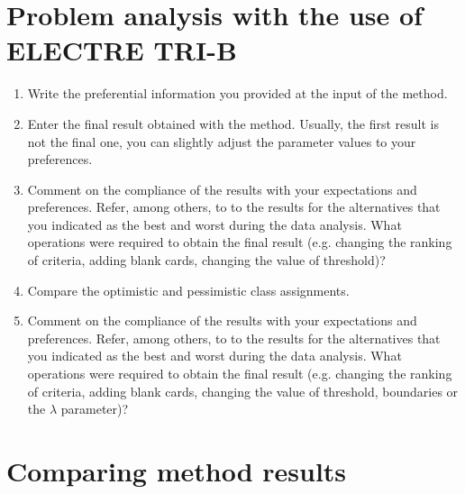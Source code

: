 \documentclass{article}
\begin{document}

\section{Problem analysis with the use of ELECTRE TRI-B}

\begin{enumerate}

    \item Write the preferential information you provided at the input of the method.

    \item Enter the final result obtained with the method. Usually, the first result is not the final one, you can
    slightly adjust the parameter values to your preferences.

    \item Comment on the compliance of the results with your expectations and preferences. Refer, among
    others, to to the results for the alternatives that you indicated as the best and worst during the data
    analysis. What operations were required to obtain the final result (e.g. changing the ranking of criteria,
    adding blank cards, changing the value of threshold)?

    \item Compare the optimistic and pessimistic class assignments.

    \item Comment on the compliance of the results with your expectations and preferences. Refer, among
    others, to to the results for the alternatives that you indicated as the best and worst during the data
    analysis. What operations were required to obtain the final result (e.g. changing the ranking of criteria,
    adding blank cards, changing the value of threshold, boundaries or the $\lambda$ parameter)?

\end{enumerate}

\section{Comparing method results}
\end{document}

